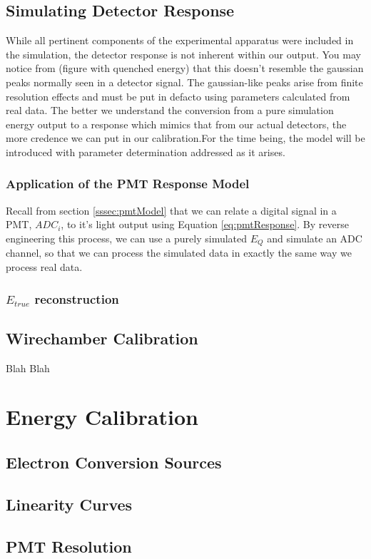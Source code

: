 \subsection{Simulating Detector Response}
While all pertinent components of the experimental apparatus were included
in the simulation, the detector response is not inherent within our
output. You may notice from (figure with quenched energy) that this
doesn't resemble the gaussian peaks normally seen in a detector signal.
The gaussian-like peaks arise from finite resolution effects and
must be put in defacto using parameters calculated
from real data. The better we understand the conversion from a pure simulation
energy output to a response which mimics that from our actual detectors, the
more credence we can put in our calibration.For the time being, the model will be introduced with parameter determination addressed as it arises. 

\subsubsection{Application of the PMT Response Model}

Recall from section \ref{sssec:pmtModel} that we can relate a digital signal
in a PMT, $ADC_i$, to it's light output using Equation \ref{eq:pmtResponse}.
By reverse engineering this process, we can use a purely simulated $E_Q$ and
simulate an ADC channel, so that we can process the simulated data in
exactly the same way we process real data.



\subsubsection{$E_{true}$ reconstruction}

\subsection{Wirechamber Calibration}

Blah Blah


\section{Energy Calibration}
\subsection{Electron Conversion Sources}
\subsection{Linearity Curves}
\subsection{PMT Resolution}








